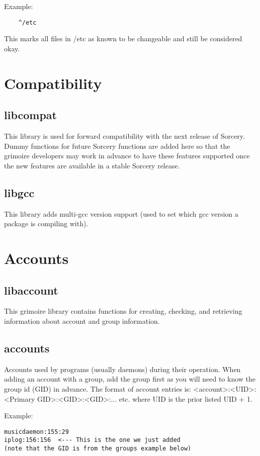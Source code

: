 \documentclass[a4paper,10pt]{book}
\begin{document}
Example:
\begin{verbatim}
	^/etc
\end{verbatim}

This marks all files in /etc as known to be changeable and still be
considered okay.

\chapter{Compatibility}
\section{libcompat}
This library is used for forward compatibility with the next release of
Sorcery. Dummy functions for future Sorcery functions are added here so
that the grimoire developers may work in advance to have these features
supported once the new features are available in a stable Sorcery release.

\section{libgcc}
This library adds multi-gcc version support (used to set which gcc version
a package is compiling with).

\chapter{Accounts}
\section{libaccount}
This grimoire library contains functions for creating, checking, and
retrieving information about account and group information.

\section{accounts}
Accounts used by programs (usually daemons) during their operation. When
adding an account with a group, add the group first as you will need to
know the group id (GID) in advance. The format of account entries is:
	<account>:<UID>:<Primary GID>:<GID>:<GID>:... etc.
where UID is the prior listed UID + 1.

Example:
\begin{verbatim}
musicdaemon:155:29
iplog:156:156  <--- This is the one we just added
(note that the GID is from the groups example below)
\end{verbatim}
\end{document}

